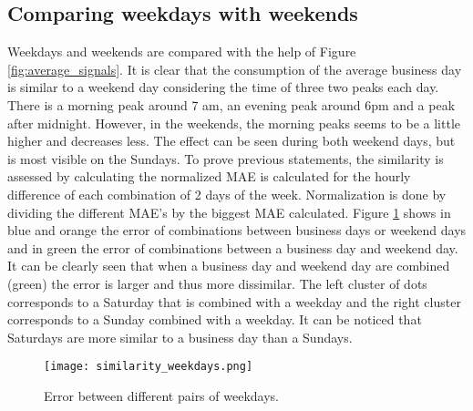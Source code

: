 \subsection{Comparing weekdays with weekends} \label{s:Comparing weekdays with weekends}
Weekdays and weekends are compared with the help of Figure \ref{fig:average_signals}. It is clear that the consumption of the average business day is similar to a weekend day considering the time of three two peaks each day. There is a morning peak around 7 am, an evening peak around 6pm and a peak after midnight. However, in the weekends, the morning peaks seems to be a little higher and decreases less. The effect can be seen during both weekend days, but is most visible on the Sundays. To prove previous statements, the similarity is assessed by calculating the normalized MAE is calculated for the hourly difference of each combination of 2 days of the week. Normalization is done by dividing the different MAE's by the biggest MAE calculated. Figure \ref{fig:similarity_weekdays} shows in blue and orange the error of combinations between business days or weekend days and in green the error of combinations between a business day and weekend day. It can be clearly seen that when a business day and weekend day are combined (green) the error is larger and thus more dissimilar. The left cluster of dots corresponds to a Saturday that is combined with a weekday and the right cluster corresponds to a Sunday combined with a weekday. It can be noticed that Saturdays are more similar to a business day than a Sundays. 

\begin{figure}[h!]
	\centering
	\texttt{[image: similarity\_weekdays.png]}
	\caption{Error between different pairs of weekdays.}
	\label{fig:similarity_weekdays}
\end{figure}

